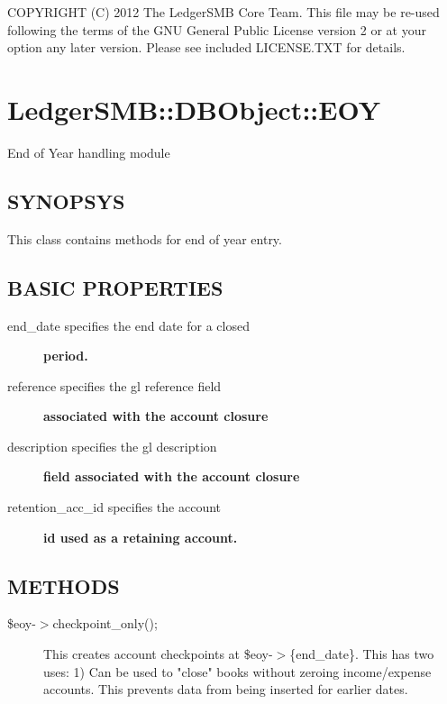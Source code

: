 \begin{description}
\begin{description}
\begin{description}
\begin{description}
\begin{description}
\begin{description}
\begin{description}
\begin{description}
\begin{description}
\begin{description}
COPYRIGHT (C) 2012 The LedgerSMB Core Team.  This file may be re-used following
the terms of the GNU General Public License version 2 or at your option any
later version.  Please see included LICENSE.TXT for details.

\section{LedgerSMB::DBObject::EOY\label{LedgerSMB::DBObject::EOY}}


End of Year handling module

\subsection*{SYNOPSYS\label{LedgerSMB::DBObject::EOY_SYNOPSYS}}


This class contains methods for end of year entry.

\subsection*{BASIC PROPERTIES\label{LedgerSMB::DBObject::EOY_BASIC_PROPERTIES}}
\begin{description}

\item[{end\_date specifies the end date for a closed}] \textbf{period.}
\item[{reference specifies the gl reference field}] \textbf{associated with the account closure}
\item[{description specifies the gl description}] \textbf{field associated with the account closure}
\item[{retention\_acc\_id specifies the account}] \textbf{id used as a retaining account.}\end{description}
\subsection*{METHODS\label{LedgerSMB::DBObject::EOY_METHODS}}
\begin{description}

\item[{\$eoy-$>$checkpoint\_only();}] \mbox{}

This creates account checkpoints at \$eoy-$>$\{end\_date\}.  This has two uses:
1)  Can be used to "close" books without zeroing income/expense accounts.  This
prevents data from being inserted for earlier dates.




\end{description}
\end{description}
\end{description}
\end{description}
\end{description}
\end{description}
\end{description}
\end{description}
\end{description}
\end{description}
\end{description}
